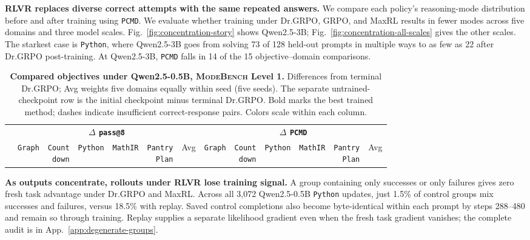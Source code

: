 \documentclass{article}
\newcommand{\1}{\mathbf 1}
\newcommand{\mb}{\textsc{ModeBench}}
\newcommand{\pmd}{\texttt{PCMD}}
\theoremstyle{remark}
\theoremstyle{definition}
\theoremstyle{plain}
\begin{document}
\textbf{RLVR replaces diverse correct attempts with the same repeated answers.}
We compare each policy's reasoning-mode distribution before and after training using \pmd{}. We evaluate whether training under Dr.GRPO, GRPO, and MaxRL results in fewer modes across five domains and three model scales. Fig.~\ref{fig:concentration-story} shows Qwen2.5-3B; Fig.~\ref{fig:concentration-all-scales} gives the other scales. The starkest case is \texttt{Python}, where Qwen2.5-3B goes from solving 73 of 128 held-out prompts in multiple ways to as few as 22 after Dr.GRPO post-training. At Qwen2.5-3B, \pmd{} falls in 14 of the 15 objective--domain comparisons.

\begin{table}[!b]
  \centering
  \caption{\textbf{Compared objectives under Qwen2.5-0.5B, \mb{} Level 1.} Differences from terminal Dr.GRPO; Avg weights five domains equally within seed (five seeds). The separate untrained-checkpoint row is the initial checkpoint minus terminal Dr.GRPO. Bold marks the best trained method; dashes indicate insufficient correct-response pairs. Colors scale within each column.}
  \label{tab:direct-comparator-matrix}
  \scriptsize
  \setlength{\tabcolsep}{1.4pt}
  \renewcommand{\arraystretch}{0.95}
  \begin{tabular}{@{}l*{12}{r}@{}}
    \toprule
    & \multicolumn{6}{c}{\textbf{$\Delta$ \texttt{pass@8}}}
      & \multicolumn{6}{c}{\textbf{$\Delta$ \pmd{}}} \\
    \cmidrule(lr){2-7}\cmidrule(l){8-13}
    & \texttt{Graph}
    & \shortstack{\texttt{Count}\\\texttt{down}}
    & \texttt{Python}
    & \texttt{MathIR}
    & \shortstack{\texttt{Pantry}\\\texttt{Plan}}
    & Avg
    & \texttt{Graph}
    & \shortstack{\texttt{Count}\\\texttt{down}}
    & \texttt{Python}
    & \texttt{MathIR}
    & \shortstack{\texttt{Pantry}\\\texttt{Plan}}
    & Avg \\
    \midrule
    
  \end{tabular}
\end{table}


\textbf{As outputs concentrate, rollouts under RLVR lose training signal.}
A group containing only successes or only failures gives zero fresh task advantage under Dr.GRPO and MaxRL. Across all 3,072 Qwen2.5-0.5B \texttt{Python} updates, just 1.5\% of control groups mix successes and failures, versus 18.5\% with replay. Saved control completions also become byte-identical within each prompt by steps 288--480 and remain so through training. Replay supplies a separate likelihood gradient even when the fresh task gradient vanishes; the complete audit is in App.~\ref{app:degenerate-groups}.
\end{document}
